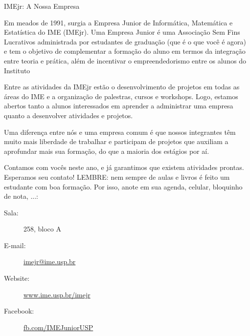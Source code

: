 \begin{subsecao}{IMEjr: A Nossa Empresa}


Em meados de 1991, surgia a Empresa Junior de Informática, Matemática e
Estatística do IME (IMEjr). Uma Empresa Junior é uma Associação Sem Fins
Lucrativos administrada por estudantes de graduação (que é o que você é agora)
e tem o objetivo de complementar a formação do aluno em termos da integração
entre teoria e prática, além de incentivar o empreendedorismo entre os alunos
do Instituto

Entre as atividades da IMEjr estão o desenvolvimento de projetos em todas as
áreas do IME e a organização de palestras, cursos e workshops. Logo, estamos
abertos tanto a alunos interessados em aprender a administrar uma empresa
quanto a desenvolver atividades e projetos.

Uma diferença entre nós e uma empresa comum é que nossos integrantes têm muito
mais liberdade de trabalhar e participam de projetos que auxiliam a aprofundar
mais sua formação, do que a maioria dos estágios por aí.

Contamos com vocês neste ano, e já garantimos que existem atividades prontas.
Esperamos seu contato! LEMBRE: nem sempre de aulas e livros é feito um
estudante com boa formação. Por isso, anote em sua agenda, celular, bloquinho
de nota, ...:

\vspace{-1em}

\begin{description}
\item [Sala:] 258, bloco A
\item[E-mail:] \url{imejr@ime.usp.br}
\item[Website:] \url{www.ime.usp.br/imejr}
\item[Facebook:] \url{fb.com/IMEJuniorUSP}
\end{description}

\vspace{-.5em}

\end{subsecao}
